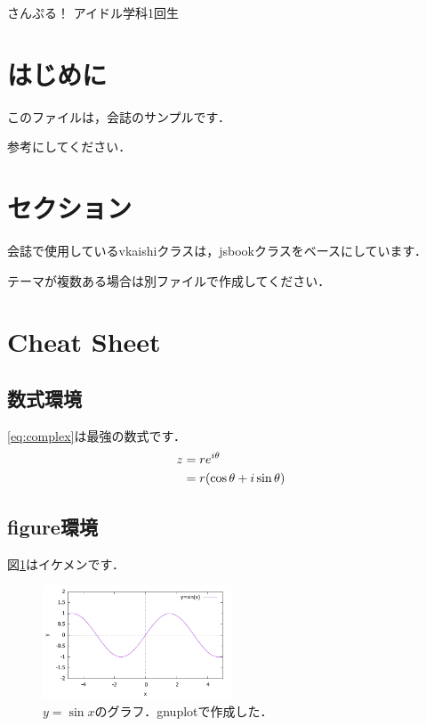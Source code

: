 \documentclass[uplatex,dvipdfmx]{vkaishi}
\begin{document}


\kaishititle
  {さんぷる！}%
  {アイドル学科1回生}%
  {}%

%
\section*{はじめに}
このファイルは，会誌のサンプルです．\par
参考にしてください．

%
\section{セクション}
会誌で使用しているvkaishiクラスは，jsbookクラスをベースにしています．\par
テーマが複数ある場合は別ファイルで作成してください．

%
\section{Cheat Sheet}

\subsection{数式環境}
\eqref{eq:complex}は最強の数式です．
\begin{align}
  z &= r e^{i\theta} \notag \\
    &= r (\cos\theta + i\sin\theta) \label{eq:complex}
\end{align}

\subsection{figure環境}
図\ref{fig:sin}はイケメンです．
\begin{figure}[htbp]
  \centering
  \includegraphics[width=0.5\textwidth]{img/fig-sin.pdf}
  \caption{$y=\sin x$のグラフ．gnuplotで作成した．}
  \label{fig:sin}
\end{figure}
\end{document}

